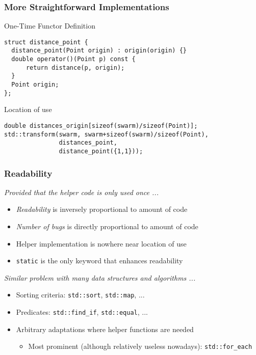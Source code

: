 \begin{frame}[fragile]
  \frametitle{More Straightforward Implementations}

  \begin{block}{One-Time Functor Definition}
\begin{verbatim}
struct distance_point {
  distance_point(Point origin) : origin(origin) {}
  double operator()(Point p) const {
      return distance(p, origin);
  }
  Point origin;
};
\end{verbatim}
  \end{block}

  \begin{block}{Location of use}
\begin{verbatim}
double distances_origin[sizeof(swarm)/sizeof(Point)];
std::transform(swarm, swarm+sizeof(swarm)/sizeof(Point), 
               distances_point, 
               distance_point({1,1}));
\end{verbatim}
  \end{block}

\end{frame}

\begin{frame}
  \frametitle{Readability}

  \textit{Provided that the helper code is only used once ...}

  \begin{itemize}
  \item \textit{Readability} is inversely proportional to amount of
    code
  \item \textit{Number of bugs} is directly proportional to amount of
    code
  \item Helper implementation is nowhere near location of use
  \item \texttt{static} is the only keyword that enhances readability
  \end{itemize}

  \textit{Similar problem with many data structures and algorithms
    ...}

  \begin{itemize}
  \item Sorting criteria: \texttt{std::sort}, \texttt{std::map}, ...
  \item Predicates: \texttt{std::find\_if}, \texttt{std::equal}, ...
  \item Arbitrary adaptations where helper functions are needed
    \begin{itemize}
    \item Most prominent (although relatively useless nowadays):
      \texttt{std::for\_each}
    \end{itemize}
  \end{itemize}
  
\end{frame}


